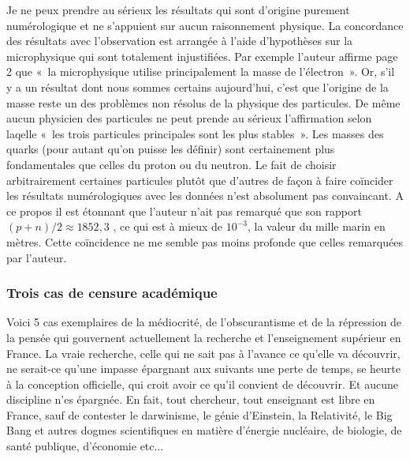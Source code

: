 \documentclass[a4paper,12pt]{article}
\begin{document}
Je ne peux prendre au sérieux les résultats qui sont d’origine purement numérologique et ne s’appuient sur aucun raisonnement physique. La concordance des résultats avec l’observation est arrangée à l’aide d’hypothèses sur la microphysique qui sont totalement injustifiées. Par exemple l’auteur affirme page 2 que « la microphysique utilise principalement la masse de l’électron ». Or, s’il y a un résultat dont nous sommes certains aujourd’hui, c’est que l’origine de la masse reste un des problèmes non résolus de la physique des particules. De même aucun physicien des particules ne peut prende au sérieux l’affirmation selon laqelle « les trois particules principales sont les plus stables ». Les masses des quarks (pour autant qu’on puisse les définir) sont certainement plus fondamentales que celles du proton ou du neutron. Le fait de choisir arbitrairement certaines particules plutôt que d’autres de façon à faire coïncider les résultats numérologiques avec les données n’est absolument pas convaincant. A ce propos il est étonnant que l’auteur n’ait pas remarqué que son rapport $(p+n)/2 \approx 1852,3$ , ce qui est à mieux de $10^{-3}$, la valeur du mille marin en mètres. Cette coïncidence ne me semble pas moins profonde que celles remarquées par l’auteur.    



\subsubsection{Trois cas de censure académique}

Voici 5 cas exemplaires de la médiocrité, de l’obscurantisme et de la répression de la pensée qui gouvernent actuellement la recherche et l’enseignement supérieur en France. La vraie recherche, celle qui ne sait pas à l’avance ce qu’elle va découvrir, ne serait-ce qu’une impasse épargnant aux suivants une perte de temps, se heurte à la conception officielle, qui croit avoir ce qu’il convient de découvrir. Et aucune discipline n’es épargnée. En fait, tout chercheur, tout enseignant est libre en France, sauf de contester le darwinisme, le génie d’Einstein, la Relativité, le Big Bang et autres dogmes scientifiques en matière d’énergie nucléaire, de biologie, de santé publique, d’économie etc...  
\end{document}
